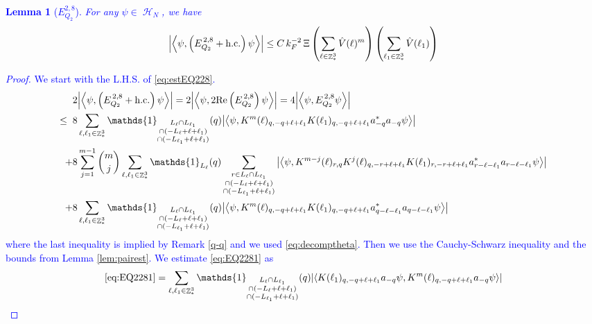 \documentclass[sn-mathphys, Numbered ,a4paper]{sn-jnl}%
\DeclareMathOperator{\Z}{\mathbb{Z}}
\DeclareMathOperator{\HH}{\mathcal{H}}
\newcommand{\eva}[1]{\left\langle #1 \right\rangle}
\theoremstyle{plain}
\newtheorem{lemma}[theorem]{Lemma}
\theoremstyle{definition}
\theoremstyle{remark}
\theoremstyle{plain}
\theoremstyle{definition}
\theoremstyle{remark}
\begin{document}
\textcolor{blue}{\begin{lemma}[$E_{Q_2}^{2,8}$]
For any $\psi \in \HH_N$, we have
\begin{align}
	\abs{\eva{\psi,\left(E^{\,2,8}_{Q_2}+\mathrm{h.c.}\right) \psi }}
		\leq  C\, k_{F}^{-2}\, \Xi \left(\sum\limits_{\ell \in \Z^3_*} \hat{V}(\ell)^m \right) \left(\sum\limits_{\ell_1 \in \Z^3_*} \hat{V}(\ell_1) \right) \label{eq:estEQ228}
	\end{align}
\end{lemma}
\begin{proof}
We start with the L.H.S. of \eqref{eq:estEQ228}.
\begin{align}
	&2\abs{\eva{\psi,\left(E^{\,2,8}_{Q_2}+\mathrm{h.c.}\right) \psi }} = 2\abs{\eva{\psi,2\mathrm{Re}\left(E^{\,2,8}_{Q_2}\right) \psi }} = 4\abs{\eva{\psi, E^{\,2,8}_{Q_2} \psi }}\nonumber\\
	\leq\;\;&8 \sum\limits_{\ell, \ell_1\in \Z^3_*} \mathds{1}_{\substack{L_{\ell}\cap L_{\ell_1}\\\cap (-L_{\ell}+\ell+\ell_1) \\ \cap (-L_{\ell_1}+\ell+\ell_1)}}(q) \abs{\eva{\psi, K^m(\ell)_{q,-q+\ell+\ell_1}K(\ell_1)_{q,-q+\ell+\ell_1} a^*_{-q}a_{-q} \psi}} \label{eq:EQ2281}\\
	\;+&8 \sum\limits_{j=1}^{m-1} {{m}\choose j} \sum\limits_{\ell, \ell_1\in \Z^3_*}\mathds{1}_{L_{\ell}}(q) \sum\limits_{\substack{r\in L_{\ell} \cap L_{\ell_1}\\\cap (-L_{\ell}+\ell+\ell_1) \\ \cap (-L_{\ell_1}+\ell+\ell_1)}}  \abs{\eva{\psi, K^{m-j}(\ell)_{r,q} K^j(\ell)_{q,-r+\ell+\ell_1} K(\ell_1)_{r,-r+\ell+\ell_1} a^*_{r-\ell-\ell_1}a_{r-\ell-\ell_1} \psi }} \label{eq:EQ2282}\\
	\;+&8\sum\limits_{\ell, \ell_1\in \Z^3_*} \mathds{1}_{\substack{L_{\ell}\cap L_{\ell_1}\\\cap (-L_{\ell}+\ell+\ell_1) \\ \cap (-L_{\ell_1}+\ell+\ell_1)}}(q)  \abs{\eva{\psi, K^m(\ell)_{q,-q+\ell+\ell_1} K(\ell_1)_{q,-q+\ell+\ell_1} a^*_{q-\ell-\ell_1}a_{q-\ell-\ell_1} \psi}} \label{eq:EQ2283}
\end{align}
where the last inequality is implied by Remark \ref{q-q} and we used \eqref{eq:decomptheta}. Then we use the Cauchy-Schwarz inequality and the bounds from Lemma \ref{lem:pairest}.
We estimate \eqref{eq:EQ2281} as 
\begin{align}
	\eqref{eq:EQ2281}
	&= \sum\limits_{\ell, \ell_1\in \Z^3_*} \mathds{1}_{\substack{L_{\ell}\cap L_{\ell_1}\\\cap (-L_{\ell}+\ell+\ell_1) \\ \cap (-L_{\ell_1}+\ell+\ell_1)}}(q) \abs{\eva{ K(\ell_1)_{q,-q+\ell+\ell_1} a_{-q} \psi, K^m(\ell)_{q,-q+\ell+\ell_1} a_{-q} \psi }}\nonumber\\

\end{align}
\end{proof}}
\end{document}
